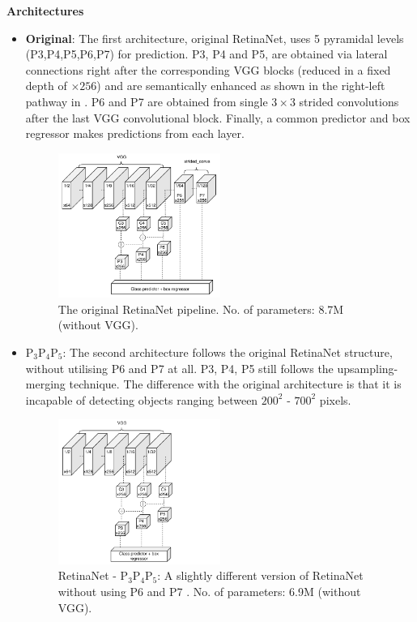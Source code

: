 \textbf{Architectures}
\begin{itemize}
 \item{\textbf{Original}:}\label{arch_1} 
The first architecture, original RetinaNet, uses 5 pyramidal levels (P3,P4,P5,P6,P7) for prediction. P3, P4 and P5, are obtained via lateral connections right after the corresponding VGG blocks (reduced in a fixed depth of $\times256$) and are semantically enhanced as shown in the right-left pathway in . P6 and P7 are obtained from single $3\times3$ strided convolutions after the last VGG convolutional block. Finally, a common predictor and box regressor makes predictions from each layer.

\begin{figure}[!htb]
  \centering
  \includegraphics[width=0.5\textwidth]{figures/ch3/fig3.pdf}
  \caption{The original RetinaNet pipeline. No. of parameters: 8.7M (without VGG).}
  \label{fig3}
\end{figure} 

 \item{\textbf{$\text{P}_3\text{P}_4\text{P}_5$}:}\label{arch_2}
The second architecture follows the original RetinaNet structure, without utilising P6 and P7 at all. P3, P4, P5 still follows the upsampling-merging technique. The difference with the original architecture is that it is incapable of detecting objects ranging  between $200^2$ - $700^2$ pixels.

\begin{figure}[!htb]
  \centering
  \includegraphics[width=0.5\textwidth]{figures/ch3/fig4.pdf}
  \caption{RetinaNet - $\text{P}_3\text{P}_4\text{P}_5$: A slightly different version of RetinaNet without using P6 and P7 . No. of parameters: 6.9M (without VGG).}
  \label{fig4}
\end{figure} 


\end{itemize}
